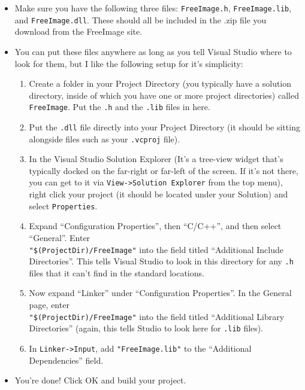 \documentclass[]{article}
\begin{document}
\begin{itemize}
\item Make sure you have the following three files: \verb=FreeImage.h=, \verb=FreeImage.lib=, and \verb=FreeImage.dll=. These should all be included in the .zip file you download from the FreeImage site.

\item You can put these files anywhere as long as you tell Visual Studio where to look for them, but I like the following setup for it's simplicity:


\begin{enumerate}

\item Create a folder in your Project Directory (you typically have a solution directory, inside of which you have one or more project directories) called \verb=FreeImage=. Put the \verb=.h= and the \verb=.lib= files in here.

\item Put the \verb=.dll= file directly into your Project Directory (it should be sitting alongside files such as your \verb=.vcproj= file).

\item In the Visual Studio Solution Explorer (It's a tree-view widget that's typically docked on the far-right or far-left of the screen. If it's not there, you can get to it via \verb=View->Solution Explorer= from the top menu), right click your project (it should be located under your Solution) and select \verb=Properties=.

\item Expand ``Configuration Properties'', then ``C/C++'', and then select ``General''. Enter \\\verb="$(ProjectDir)/FreeImage"= into the field titled ``Additional Include Directories''. This tells Visual Studio to look in this directory for any \verb=.h= files that it can't find in the standard locations.

\item Now expand ``Linker'' under ``Configuration Properties''. In the General page, enter \\ \verb="$(ProjectDir)/FreeImage"= into the field titled ``Additional Library Directories'' (again, this tells Studio to look here for \verb=.lib= files).

\item In \verb=Linker->Input=, add \verb="FreeImage.lib"= to the ``Additional Dependencies'' field.

\end{enumerate}

\item You're done! Click OK and build your project. 

\end{itemize}
\end{document}

